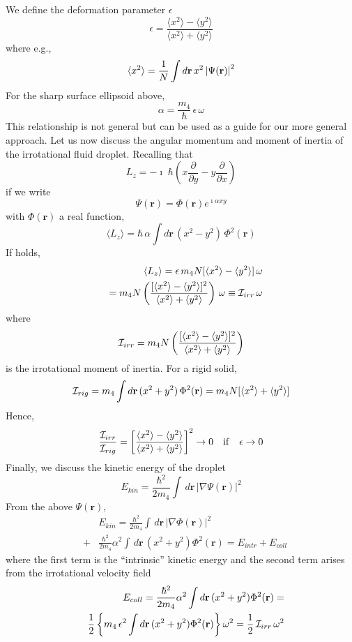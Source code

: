We define the deformation parameter $\epsilon$
%
$$
\epsilon =\frac{\langle x^2 \rangle - \langle y^2 \rangle}{\langle x^2 \rangle + \langle y^2 \rangle}
$$
%
where e.g., 
$$ \langle x^2 \rangle = \frac{1}{N} \int d\mathbf{r} \,  x^2 \,\abs{\Psi(\mathbf{r})}^2 $$
%
For the sharp surface ellipsoid above,
%
\begin{equation}
 \alpha = \frac{m_4}{\hbar} \, \epsilon \, \omega
 \label{eps}
 \end{equation}
%
This relationship is not  general but  can be used as a guide for our more general approach.
Let us  now discuss the angular momentum and moment of inertia of the irrotational fluid droplet. Recalling that
%
$$L_z = - \imath \; \hbar \left( x \frac{\partial}{\partial y} -  y \frac{\partial}{\partial x}\right)$$
%
if we write 
%
$$\Psi(\mathbf{r}) = \Phi(\mathbf{r}) e^{\imath \alpha xy}$$
%
with $\Phi(\mathbf{r})$ a real function,
%
$$\langle L_z \rangle = \hbar\,  \alpha  \int d\mathbf{r} \,  (x^2-y^2)  \,\Phi^2(\mathbf{r})$$
%
If  holds,
%
\begin{eqnarray}
&&\langle L_z \rangle = \epsilon \, m_4 N  [\langle x^2 \rangle - \langle y^2\rangle]\, \omega   
\nonumber
\\ 
&& = m_4  N \left( \frac{[\langle x^2 \rangle - \langle y^2\rangle ]^2}{\langle x^2 \rangle + \langle y^2\rangle} \right)\, \omega  \equiv  {\cal I}_{irr} \, \omega
 \label{irrot}
\end{eqnarray}
%
where 
%
$$ {\cal I}_{irr} = m_4 N \left( \frac{[\langle x^2 \rangle - \langle y^2\rangle ]^2}{\langle x^2 \rangle + \langle y^2\rangle} \right)$$
%
is the irrotational moment of inertia. For a rigid solid,
%
$$  {\cal I}_{rig} =  m_4  \int d\mathbf{r} \,  (x^2+y^2)  \,\Phi^2(\mathbf{r}) = m_4 N [\langle x^2 \rangle + \langle y^2\rangle] $$
%
Hence, 
%
$$ \frac{{\cal I}_{irr}}{{\cal I}_{rig}} = \left[ \frac{\langle x^2 \rangle - \langle y^2\rangle }{\langle x^2 \rangle + \langle y^2\rangle} \right]^2 \rightarrow 0 \quad {\rm if} \quad \epsilon \rightarrow 0$$
%
Finally, we discuss the kinetic energy of the droplet
%
$$ E_{kin} = \frac{\hbar^2}{2 m_4}  \int \, d\mathbf{r} \,|\nabla \Psi(\mathbf{r})|^2$$
%
From the above $\Psi(\mathbf{r})$, 
%
\begin{eqnarray}
&&E_{kin}= \frac{\hbar^2}{2 m_4}  \int \, d\mathbf{r} \,|\nabla \Phi(\mathbf{r})|^2
\nonumber
\\
\nonumber
&+& \frac{\hbar^2}{2 m_4} \alpha^2 \int \, d\mathbf{r} \, (x^2 + y^2) \Phi^2(\mathbf{r})= E_{intr}+E_{coll}
\end{eqnarray}
%
where the first term is the ``intrinsic'' kinetic energy and the second term arises from the irrotational velocity field
%
\begin{eqnarray}
&&E_{coll}= \frac{\hbar^2}{2 m_4} \alpha^2 \int  d\mathbf{r} \, (x^2 + y^2) \Phi^2(\mathbf{r}) =
\nonumber
\\
\nonumber
&& \frac{1}{2} \left\{ m_4\, \epsilon^2 \int d\mathbf{r} \, (x^2 + y^2) \Phi^2(\mathbf{r})\right\} \omega^2= \frac{1}{2}\, {\cal I}_{irr} \,\omega^2
 \end{eqnarray}
% 

